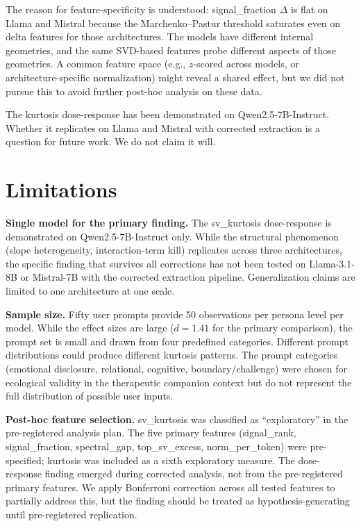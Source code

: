 \documentclass[11pt]{article}
\begin{document}
The reason for feature-specificity is understood: signal\_fraction $\Delta$ is flat on Llama and Mistral because the Marchenko--Pastur threshold saturates even on delta features for those architectures. The models have different internal geometries, and the same SVD-based features probe different aspects of those geometries. A common feature space (e.g., $z$-scored across models, or architecture-specific normalization) might reveal a shared effect, but we did not pursue this to avoid further post-hoc analysis on these data.

The kurtosis dose-response has been demonstrated on Qwen2.5-7B-Instruct. Whether it replicates on Llama and Mistral with corrected extraction is a question for future work. We do not claim it will.

\section{Limitations}
\label{sec:limitations}

\textbf{Single model for the primary finding.} The sv\_kurtosis dose-response is demonstrated on Qwen2.5-7B-Instruct only. While the structural phenomenon (slope heterogeneity, interaction-term kill) replicates across three architectures, the specific finding that survives all corrections has not been tested on Llama-3.1-8B or Mistral-7B with the corrected extraction pipeline. Generalization claims are limited to one architecture at one scale.

\textbf{Sample size.} Fifty user prompts provide 50 observations per persona level per model. While the effect sizes are large ($d = 1.41$ for the primary comparison), the prompt set is small and drawn from four predefined categories. Different prompt distributions could produce different kurtosis patterns. The prompt categories (emotional disclosure, relational, cognitive, boundary/challenge) were chosen for ecological validity in the therapeutic companion context but do not represent the full distribution of possible user inputs.

\textbf{Post-hoc feature selection.} sv\_kurtosis was classified as ``exploratory'' in the pre-registered analysis plan. The five primary features (signal\_rank, signal\_fraction, spectral\_gap, top\_sv\_excess, norm\_per\_token) were pre-specified; kurtosis was included as a sixth exploratory measure. The dose-response finding emerged during corrected analysis, not from the pre-registered primary features. We apply Bonferroni correction across all tested features to partially address this, but the finding should be treated as hypothesis-generating until pre-registered replication.
\end{document}

